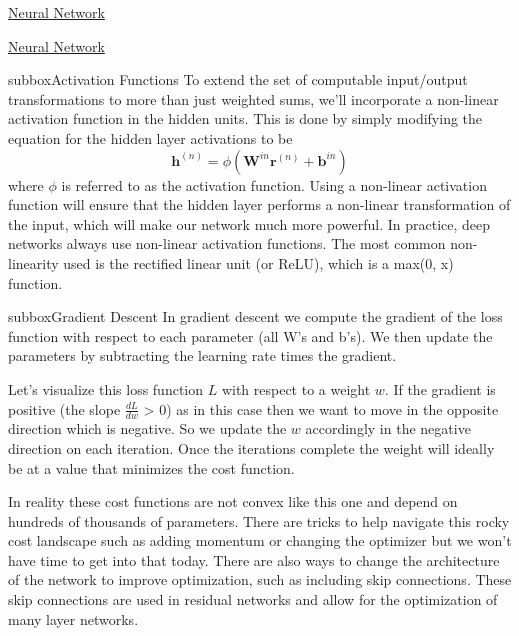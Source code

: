 \begin{textbox}{\href{https://compneuro.neuromatch.io/tutorials/W1D5_DeepLearning/student/W1D5_Tutorial1.html}{Neural Network } }
\end{textbox}
\begin{textbox}{\href{https://compneuro.neuromatch.io/tutorials/W1D5_DeepLearning/student/W1D5_Tutorial1.html}{Neural Network } }
\begin{subbox}{subbox}{Activation Functions}
\scriptsize
To extend the set of computable input/output transformations to more than just weighted sums, we'll incorporate a non-linear activation function in the hidden units. This is done by simply modifying the equation for the hidden layer activations to be
\begin{equation}
    \mathbf{h}^{(n)} = \phi(\mathbf{W}^{in} \mathbf{r}^{(n)} + \mathbf{b}^{in})
\end{equation}
where $\phi$ is referred to as the activation function. Using a non-linear activation function will ensure that the hidden layer performs a non-linear transformation of the input, which will make our network much more powerful. In practice, deep networks always use non-linear activation functions.
The most common non-linearity used is the rectified linear unit (or ReLU), which is a max(0, x) function.

\end{subbox}
\begin{subbox}{subbox}{Gradient Descent}
\scriptsize
In gradient descent we compute the gradient of the loss function with respect to each parameter (all W’s and b’s). We then update the parameters by subtracting the learning rate times the gradient. 

Let’s visualize this loss function $L$ with respect to a weight $w$. If the gradient is positive (the slope $\frac{dL}{dw}$ > 0) as in this case then we want to move in the opposite direction which is negative. So we update the $w$ accordingly in the negative direction on each iteration. Once the iterations complete the weight will ideally be at a value that minimizes the cost function.

In reality these cost functions are not convex like this one and depend on hundreds of thousands of parameters. There are tricks to help navigate this rocky cost landscape such as adding momentum or changing the optimizer but we won’t have time to get into that today. There are also ways to change the architecture of the network to improve optimization, such as including skip connections. These skip connections are used in residual networks and allow for the optimization of many layer networks.


\end{subbox}
\end{textbox}
